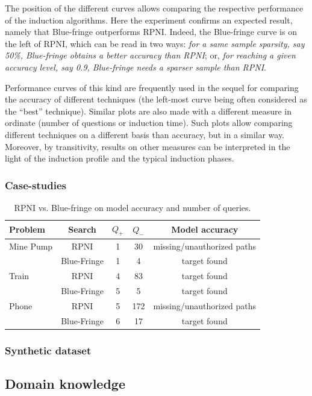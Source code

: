 The position of the different curves allows comparing the respective performance of the induction algorithms. Here the experiment confirms an expected result, namely that Blue-fringe outperforms RPNI. Indeed, the Blue-fringe curve is on the left of RPNI, which can be read in two ways: \emph{for a same sample sparsity, say 50\%, Blue-fringe obtains a better accuracy than RPNI}; or, \emph{for reaching a given accuracy level, say 0.9, Blue-fringe needs a sparser sample than RPNI}.

Performance curves of this kind are frequently used in the sequel for comparing the accuracy of different techniques (the left-most curve being often considered as the ``best'' technique). Similar plots are also made with a different measure in ordinate (number of questions or induction time). Such plots allow comparing different techniques on a different basis than accuracy, but in a similar way. Moreover, by transitivity, results on other measures can be interpreted in the light of the induction profile and the typical induction phases.

\subsubsection*{Case-studies}

\begin{table}[H]
\small
\centering
\begin{tabular}{|l||c||c|c|c|}\hline
Problem&Search&$Q_+$&$Q_-$&Model accuracy\\\hline\hline
Mine Pump&RPNI&1&30&missing/unauthorized paths\\\cline{2-5}
&Blue-Fringe&1&4&target found\\\hline
Train&RPNI&4&83&target found\\\cline{2-5}
&Blue-Fringe&5&5&target found\\\hline
Phone&RPNI&5&172&missing/unauthorized paths\\\cline{2-5}
&Blue-Fringe&6&17&target found\\\hline
\end{tabular}
\caption{RPNI vs. Blue-fringe on model accuracy and number of queries.\label{table:evaluation-esdm}}
\end{table}

\subsubsection*{Synthetic dataset}

\subsection{Domain knowledge}


